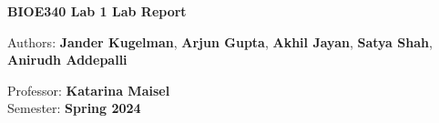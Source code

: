 \begin{titlepage}
    \begin{center}
        \vspace*{1cm}
 
         \large
        \textbf{BIOE340 Lab 1 Lab Report}
             
        \vspace{1.5cm}
        
        Authors: \textbf{Jander Kugelman}, \textbf{Arjun Gupta}, \textbf{Akhil Jayan}, \textbf{Satya Shah}, \textbf{Anirudh Addepalli}
 
       \vspace{1.5cm}
        Professor: \textbf{Katarina Maisel}\\
        Semester: \textbf{Spring 2024}
       \vspace{1 cm}
    \end{center}
\end{titlepage}